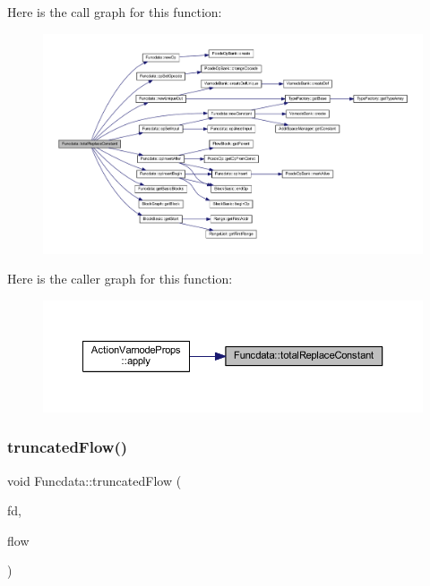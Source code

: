 Here is the call graph for this function\+:
\nopagebreak
\begin{figure}[H]
\begin{center}
\leavevmode
\includegraphics[width=350pt]{class_funcdata_a2934e1e4246d41a5e28f6fcb56acc937_cgraph}
\end{center}
\end{figure}
Here is the caller graph for this function\+:
\nopagebreak
\begin{figure}[H]
\begin{center}
\leavevmode
\includegraphics[width=350pt]{class_funcdata_a2934e1e4246d41a5e28f6fcb56acc937_icgraph}
\end{center}
\end{figure}
\mbox{\label{class_funcdata_a122718ad87c13b714676c61050461388}} 
\subsubsection{\texorpdfstring{truncatedFlow()}{truncatedFlow()}}
{\footnotesize\ttfamily void Funcdata\+::truncated\+Flow (\begin{DoxyParamCaption}\item[{const \mbox{\hyperlink{class_funcdata}{Funcdata}} $\ast$}]{fd,  }\item[{const \mbox{\hyperlink{class_flow_info}{Flow\+Info}} $\ast$}]{flow }\end{DoxyParamCaption})}



